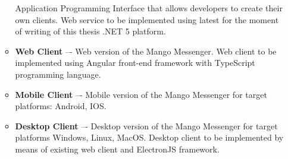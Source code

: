\begin{enumerate}
\begin{itemize}
        Application Programming Interface that allows developers to create their own clients.
        Web service to be implemented using latest for the moment of writing of this thesis .NET 5 platform.
        \item \textbf{Web Client} –- Web version of the Mango Messenger.
        Web client to be implemented using Angular front-end framework with TypeScript programming language.
        \item \textbf{Mobile Client} –- Mobile version of the Mango Messenger for target platforms: Android, IOS\@.
        \item \textbf{Desktop Client} –- Desktop version of the Mango Messenger for target platforms Windows, Linux, MacOS\@.
        Desktop client to be implemented by means of existing web client and ElectronJS framework.
    \end{itemize}
\end{enumerate}